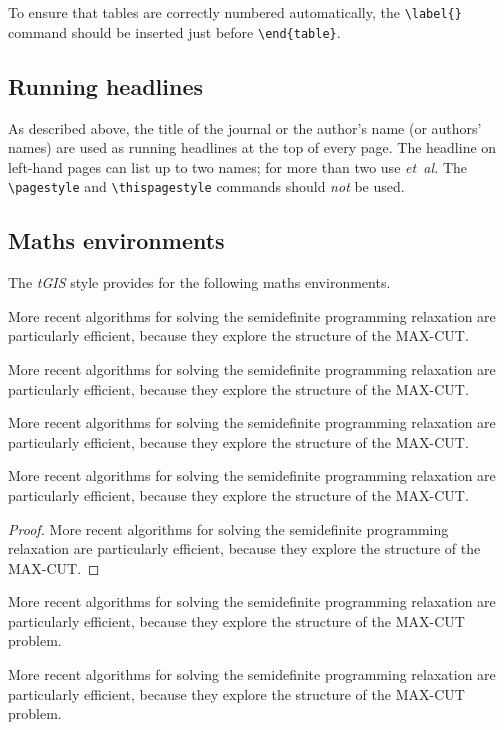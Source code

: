 \documentclass[]{tGIS2e}
\begin{document}
To ensure that tables are correctly numbered automatically, the
\verb"\label{}" command should be inserted just before
\verb"\end{table}".

\subsection{Running headlines}\label{markboth}

As described above, the title of the journal or the author's name (or authors' names) are used as running headlines at the top of every page. The headline on left-hand pages can list up to two names; for more than two use {\it et~al.} The \verb"\pagestyle" and \verb"\thispagestyle" commands should {\it not\/} be used.

\subsection{Maths environments}

The {\it tGIS} style provides for the following maths environments.

\begin{lemma}
More recent algorithms for solving the semidefinite programming
relaxation are particularly efficient, because they explore the structure
of the MAX-CUT.
\end{lemma}
\begin{theorem}
More recent algorithms for solving the semidefinite programming
relaxation are particularly efficient, because they explore the structure
of the MAX-CUT.
\end{theorem}
\begin{corollary}
More recent algorithms for solving the semidefinite programming
relaxation are particularly efficient, because they explore the
structure of the MAX-CUT.
\end{corollary}
\begin{proposition}
More recent algorithms for solving the semidefinite programming
relaxation are particularly efficient, because they explore the structure
of the MAX-CUT.
\end{proposition}
\begin{proof}
More recent algorithms for solving the semidefinite programming
relaxation are particularly efficient, because they explore the structure
of the MAX-CUT.
\end{proof}
\begin{remark}
More recent algorithms for solving the semidefinite programming
relaxation are particularly efficient, because they explore the
structure of the MAX-CUT problem.
\end{remark}
\begin{algorithm}
More recent algorithms for solving the semidefinite programming
relaxation are particularly efficient, because they explore the
structure of the MAX-CUT problem.
\end{algorithm}
\end{document}
